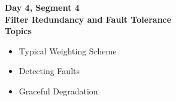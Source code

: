 \begin{frame}
\textbf{Day 4, Segment 4\\
Filter Redundancy and Fault Tolerance\\
Topics}
 \begin{itemize}
 \item Typical Weighting Scheme
 \item Detecting Faults
 \item Graceful Degradation
\end{itemize}
\end{frame}


%
%

